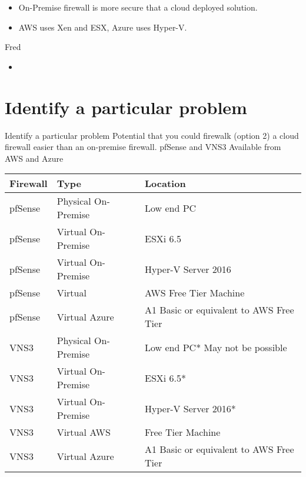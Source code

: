\documentclass[12pt]{report}
\begin{document}
\begin{itemize}
\item On-Premise firewall is more secure that a cloud deployed solution.
\item AWS uses Xen and ESX, Azure uses Hyper-V.
\end{itemize}
Fred
\begin{itemize}
\item \lipsum[2]
\end{itemize}

\newpage
\section*{Identify a particular problem}

Identify a particular problem
\newline
Potential that you could firewalk  (option 2) a cloud firewall easier than an on-premise firewall.
pfSense and VNS3 Available from AWS and Azure

\maketitle
\begin{tabular}{|l|l|l|}
\hline
\textbf{Firewall} & \textbf{Type} & \textbf{Location}\\
\hline
pfSense & Physical On-Premise & Low end PC\\
\hline
pfSense & Virtual On-Premise & ESXi 6.5\\
\hline
pfSense & Virtual On-Premise & Hyper-V Server 2016\\
\hline
pfSense & Virtual & AWS	Free Tier Machine\\
\hline
pfSense & Virtual Azure & A1 Basic or equivalent to AWS Free Tier\\
\hline
VNS3 & Physical On-Premise & Low end PC* May not be possible\\
\hline
VNS3 & Virtual On-Premise & ESXi 6.5*\\
\hline
VNS3 & Virtual On-Premise & Hyper-V Server 2016*\\
\hline
VNS3 & Virtual AWS & Free Tier Machine\\
\hline
VNS3 & Virtual Azure & A1 Basic or equivalent to AWS Free Tier\\
\hline
\end{tabular}
\newline
\newline
\end{document}
